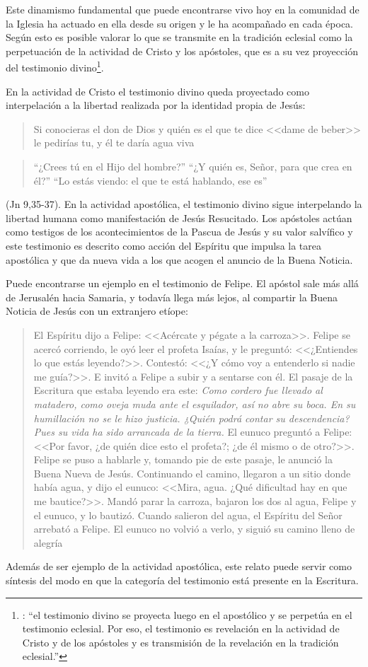 Este dinamismo fundamental que puede encontrarse vivo hoy en la comunidad de la Iglesia ha actuado en ella desde su origen y le ha acompañado en cada época. Según esto es posible valorar lo que se transmite en la tradición eclesial como la perpetuación de la actividad de Cristo y los apóstoles, que es a su vez proyección del testimonio divino\footnote{\cite[Cf.~][573]{ninot2009tf}: \enquote{el testimonio divino se proyecta luego en el apostólico y se perpetúa en el testimonio eclesial. Por eso, el testimonio es revelación en la actividad de Cristo y de los apóstoles y es transmisión de la revelación en la tradición eclesial.}}.

En la actividad de Cristo el testimonio divino queda proyectado como interpelación a la libertad realizada por la identidad propia de Jesús: \blockquote[][\,(Jn 4,10)]{Si conocieras el don de Dios y quién es el que te dice <<dame de beber>> le pedirías tu, y él te daría agua viva}; \blockquote{``¿Crees tú en el Hijo del hombre?''\textelp{} ``¿Y quién es, Señor, para que crea en él?''\textelp{} ``Lo estás viendo: el que te está hablando, ese es''} (Jn 9,35-37). En la actividad apostólica, el testimonio divino sigue interpelando la libertad humana como manifestación de Jesús Resucitado. Los apóstoles actúan como testigos de los acontecimientos de la Pascua de Jesús y su valor salvífico\autocite[Cf.][576]{ninot2009tf} y este testimonio es descrito como acción del Espíritu que impulsa la tarea apostólica y que da nueva vida a los que acogen el anuncio de la Buena Noticia.

Puede encontrarse un ejemplo en el testimonio de Felipe. El apóstol sale más allá de Jerusalén hacia Samaria, y todavía llega más lejos, al compartir la Buena Noticia de Jesús con un extranjero etíope: \blockquote[][\,(Hch 8, 29-39)]{El Espíritu dijo a Felipe: <<Acércate y pégate a la carroza>>. Felipe se acercó corriendo, le oyó leer el profeta Isaías, y le preguntó: <<¿Entiendes lo que estás leyendo?>>. Contestó: <<¿Y cómo voy a entenderlo si nadie me guía?>>. E invitó a Felipe a subir y a sentarse con él. El pasaje de la Escritura que estaba leyendo era este: \emph{Como cordero fue llevado al matadero, como oveja muda ante el esquilador, así no abre su boca. En su humillación no se le hizo justicia. ¿Quién podrá contar su descendencia? Pues su vida ha sido arrancada de la tierra.} El eunuco preguntó a Felipe: <<Por favor, ¿de quién dice esto el profeta?; ¿de él mismo o de otro?>>. Felipe se puso a hablarle y, tomando pie de este pasaje, le anunció la Buena Nueva de Jesús. Continuando el camino, llegaron a un sitio donde había agua, y dijo el eunuco: <<Mira, agua. ¿Qué dificultad hay en que me bautice?>>. Mandó parar la carroza, bajaron los dos al agua, Felipe y el eunuco, y lo bautizó. Cuando salieron del agua, el Espíritu del Señor arrebató a Felipe. El eunuco no volvió a verlo, y siguió su camino lleno de alegría}. Además de ser ejemplo de la actividad apostólica, este relato puede servir como síntesis del modo en que la categoría del testimonio está presente en la Escritura.

